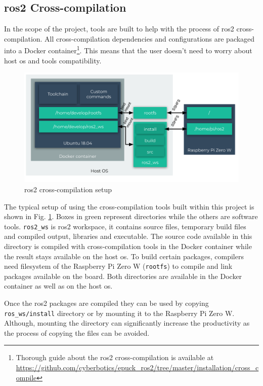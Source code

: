 \subsection{\ac{ros2} Cross-compilation}
In the scope of the project, tools are built to help with the process of \ac{ros2} cross-compilation. All cross-compilation dependencies and configurations are packaged into a Docker container\footnote{Thorough guide about the \ac{ros2} cross-compilation is available at \url{https://github.com/cyberbotics/epuck_ros2/tree/master/installation/cross_compile}}. This means that the user doesn't need to worry about host \ac{os} and tools compatibility. 

\begin{figure}[H]
    \centering
    \includegraphics[width=\textwidth]{physical/figures/cross_compilation.pdf}
    \caption{\ac{ros2} cross-compilation setup}
    \label{fig:physical:cross_compilation}
\end{figure}

The typical setup of using the cross-compilation tools built within this project is shown in Fig. \ref{fig:physical:cross_compilation}. Boxes in green represent directories while the others are software tools. \texttt{ros2\_ws} is \ac{ros2} workspace, it contains source files, temporary build files and compiled output, libraries and executable. The source code available in this directory is compiled with cross-compilation tools in the Docker container while the result stays available on the host \ac{os}. To build certain packages, compilers need filesystem of the Raspberry Pi Zero W (\texttt{rootfs}) to compile and link packages available on the board. Both directories are available in the Docker container as well as on the host \ac{os}.

Once the \ac{ros2} packages are compiled they can be used by copying \texttt{ros\_ws/install} directory or by mounting it to the Raspberry Pi Zero W. Although, mounting the directory can significantly increase the productivity as the process of copying the files can be avoided.

